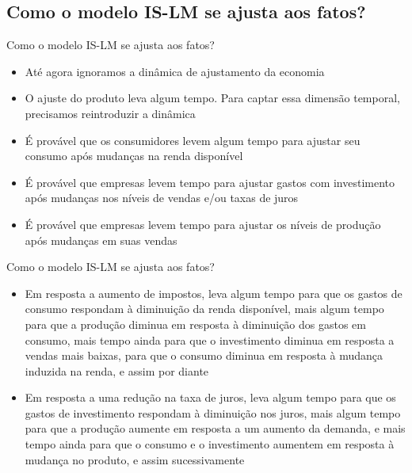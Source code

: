 \documentclass[10pt]{beamer}
\begin{document}
\subsection{Como o modelo IS-LM se ajusta aos fatos?}
\begin{frame}{Como o modelo IS-LM se ajusta aos fatos?}
    \begin{itemize}
        \item Até agora ignoramos a dinâmica de ajustamento da economia
        \bigskip
        \item O ajuste do produto leva algum tempo. Para captar essa dimensão temporal, precisamos reintroduzir a dinâmica
        \bigskip
        \item É provável que os consumidores levem algum tempo para ajustar seu consumo após mudanças na renda disponível
        \bigskip
        \item É provável que empresas levem tempo para ajustar gastos com investimento após mudanças nos níveis de vendas e/ou taxas de juros
        \bigskip
        \item É provável que empresas levem tempo para ajustar os níveis de produção após mudanças em suas vendas
    \end{itemize}
\end{frame}

\begin{frame}{Como o modelo IS-LM se ajusta aos fatos?}
\begin{itemize}
    \item Em resposta a aumento de impostos, leva algum tempo para que os gastos de consumo respondam à diminuição da renda disponível, mais algum tempo para que a produção diminua em resposta à diminuição dos gastos em consumo, mais tempo ainda para que o investimento diminua em resposta a vendas mais baixas, para que o consumo diminua em resposta à mudança induzida na renda, e assim por diante
    \bigskip
    \item Em resposta a uma redução na taxa de juros, leva algum tempo para que os gastos de investimento respondam à diminuição nos juros, mais algum tempo para que a produção aumente em resposta a um aumento da demanda, e mais tempo ainda para que o consumo e o investimento aumentem em resposta à mudança no produto, e assim sucessivamente
\end{itemize}
\end{frame}
\end{document}
